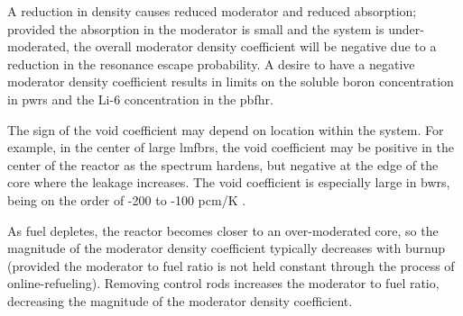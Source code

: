 A reduction in density causes reduced moderator and reduced absorption; provided the absorption in the moderator is small and the system is under-moderated, the overall moderator density coefficient will be negative due to a reduction in the resonance escape probability. A desire to have a negative moderator density coefficient results in limits on the soluble boron concentration in \glspl{pwr} and the Li-6 concentration in the \gls{pbfhr}. 

The sign of the void coefficient may depend on location within the system. For example, in the center of large \glspl{lmfbr}, the void coefficient may be positive in the center of the reactor as the spectrum hardens, but negative at the edge of the core where the leakage increases. The void coefficient is especially large in \glspl{bwr}, being on the order of -200 to -100 pcm/K \cite{duderstadt}. 

As fuel depletes, the reactor becomes closer to an over-moderated core, so the magnitude of the moderator density coefficient typically decreases with burnup (provided the moderator to fuel ratio is not held constant through the process of online-refueling). Removing control rods increases the moderator to fuel ratio, decreasing the magnitude of the moderator density coefficient.